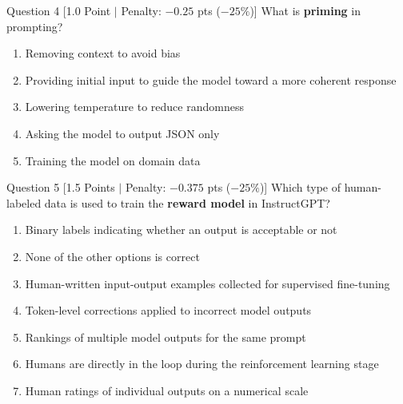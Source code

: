 \documentclass[11pt,a4paper]{article}
\begin{document}
\vspace{6pt}

\begin{questionbox}{Question 4 \hfill [1.0 Point $\vert$ Penalty: $-0.25$ pts ($-25\%$)]}
What is \textbf{priming} in prompting?
\begin{enumerate}[label=\alph*.,leftmargin=1.2cm,itemsep=3pt]
    \item Removing context to avoid bias
    \item Providing initial input to guide the model toward a more coherent response
    \item Lowering temperature to reduce randomness
    \item Asking the model to output JSON only
    \item Training the model on domain data
\end{enumerate}
\end{questionbox}

\vspace{6pt}

\begin{questionbox}{Question 5 \hfill [1.5 Points $\vert$ Penalty: $-0.375$ pts ($-25\%$)]}
Which type of human-labeled data is used to train the \textbf{reward model} in InstructGPT?
\begin{enumerate}[label=\alph*.,leftmargin=1.2cm,itemsep=3pt]
    \item Binary labels indicating whether an output is acceptable or not
    \item None of the other options is correct
    \item Human-written input-output examples collected for supervised fine-tuning
    \item Token-level corrections applied to incorrect model outputs
    \item Rankings of multiple model outputs for the same prompt
    \item Humans are directly in the loop during the reinforcement learning stage
    \item Human ratings of individual outputs on a numerical scale
\end{enumerate}
\end{questionbox}

\newpage
\end{document}
